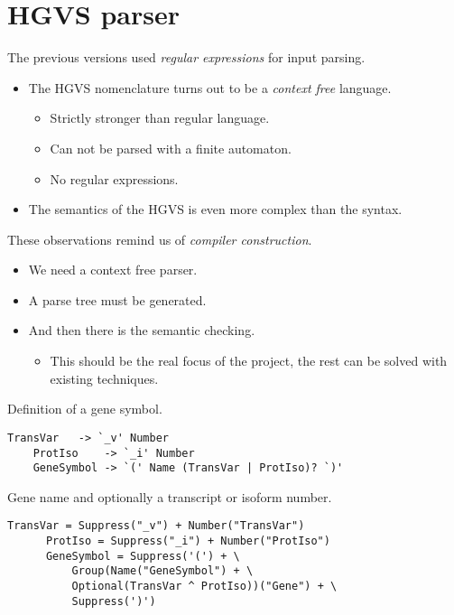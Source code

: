 \documentclass[slidestop]{beamer}
\begin{document}
\section{HGVS parser}
\begin{frame}
  The previous versions used \emph{regular expressions} for input parsing.
  \begin{itemize}
    \item The HGVS nomenclature turns out to be a \emph{context free} language.
    \begin{itemize}
      \item Strictly stronger than regular language.
      \item Can not be parsed with a finite automaton.
      \item No regular expressions.
    \end{itemize}
    \item The semantics of the HGVS is even more complex than the syntax.
  \end{itemize}
  \bigskip
  \pause

  These observations remind us of \emph{compiler construction}.
  \begin{itemize}
    \item We need a context free parser.
    \item A parse tree must be generated.
    \item And then there is the semantic checking.
    \begin{itemize}
      \item This should be the real focus of the project, the rest can be
        solved with existing techniques.
    \end{itemize}
  \end{itemize}
\end{frame}

\begin{frame}[fragile]
  Definition of a gene symbol.
  \begin{lstlisting}[language = BNF, caption = {Abstract HGVS nomenclature}]
    TransVar   -> `_v' Number
    ProtIso    -> `_i' Number
    GeneSymbol -> `(' Name (TransVar | ProtIso)? `)'
  \end{lstlisting}

  Gene name and optionally a transcript or isoform number.
  \bigskip
  \bigskip
  \bigskip
  \pause

  \begin{lstlisting}[caption = {HGVS nomenclature in Python}]
      TransVar = Suppress("_v") + Number("TransVar")
      ProtIso = Suppress("_i") + Number("ProtIso")
      GeneSymbol = Suppress('(') + \
          Group(Name("GeneSymbol") + \
          Optional(TransVar ^ ProtIso))("Gene") + \
          Suppress(')')
  \end{lstlisting}
\end{frame}
\end{document}

